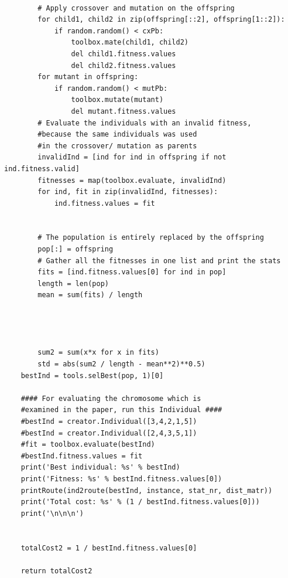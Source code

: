 \documentclass[a4paper,12pt,parskip,bibtotoc,liststotoc]{article}
\begin{document}
\begin{appendix}
\begin{lstlisting}
        
        # Apply crossover and mutation on the offspring
        for child1, child2 in zip(offspring[::2], offspring[1::2]):
            if random.random() < cxPb:
                toolbox.mate(child1, child2)
                del child1.fitness.values
                del child2.fitness.values
        for mutant in offspring:
            if random.random() < mutPb:
                toolbox.mutate(mutant)
                del mutant.fitness.values
        # Evaluate the individuals with an invalid fitness,
        #because the same individuals was used
        #in the crossover/ mutation as parents
        invalidInd = [ind for ind in offspring if not ind.fitness.valid]       
        fitnesses = map(toolbox.evaluate, invalidInd)
        for ind, fit in zip(invalidInd, fitnesses):
            ind.fitness.values = fit
   
        
        # The population is entirely replaced by the offspring
        pop[:] = offspring
        # Gather all the fitnesses in one list and print the stats
        fits = [ind.fitness.values[0] for ind in pop]
        length = len(pop)
        mean = sum(fits) / length
        
        
        
        
        sum2 = sum(x*x for x in fits)
        std = abs(sum2 / length - mean**2)**0.5)
    bestInd = tools.selBest(pop, 1)[0]
    
    #### For evaluating the chromosome which is
    #examined in the paper, run this Individual ####
    #bestInd = creator.Individual([3,4,2,1,5])
    #bestInd = creator.Individual([2,4,3,5,1])
    #fit = toolbox.evaluate(bestInd)
    #bestInd.fitness.values = fit
    print('Best individual: %s' % bestInd)
    print('Fitness: %s' % bestInd.fitness.values[0])
    printRoute(ind2route(bestInd, instance, stat_nr, dist_matr))
    print('Total cost: %s' % (1 / bestInd.fitness.values[0]))
    print('\n\n\n')


    totalCost2 = 1 / bestInd.fitness.values[0]

    return totalCost2

\end{lstlisting}

\end{appendix}
%
%
\end{document}
